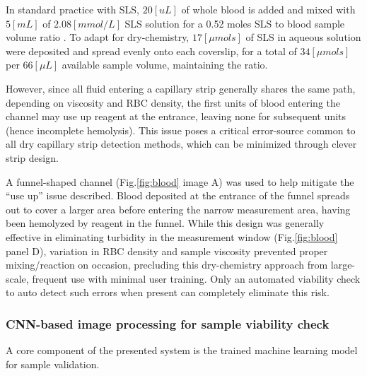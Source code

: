 \documentclass{article}
\begin{document}
In standard practice with SLS, $20[uL]$ of whole blood is added and mixed with $5[mL]$ of $2.08[mmol/L]$ SLS solution for a 0.52 moles SLS to blood sample volume ratio \cite{oshiro}. To adapt for dry-chemistry, $17[\mu mols]$ of SLS in aqueous solution were deposited and spread evenly onto each coverslip, for a total of $34[\mu mols]$ per $66[\mu L]$ available sample volume, maintaining the ratio.

However, since all fluid entering a capillary strip generally shares the same path, depending on viscosity and RBC density, the first units of blood entering the channel may use up reagent at the entrance, leaving none for subsequent units (hence incomplete hemolysis). This issue poses a critical error-source common to all dry capillary strip detection methods, which can be minimized through clever strip design.

A funnel-shaped channel (Fig.\ref{fig:blood} image A) was used to help mitigate the “use up” issue described. Blood deposited at the entrance of the funnel spreads out to cover a larger area before entering the narrow measurement area, having been hemolyzed by reagent in the funnel. While this design was generally effective in eliminating turbidity in the measurement window (Fig.\ref{fig:blood} panel D), variation in RBC density and sample viscosity prevented proper mixing/reaction on occasion, precluding this dry-chemistry approach from large-scale, frequent use with minimal user training. Only an automated viability check to auto detect such errors when present can completely eliminate this risk. 

\subsubsection{CNN-based image processing for sample viability check}

A core component of the presented system is the trained machine learning model for sample validation.
\end{document}
